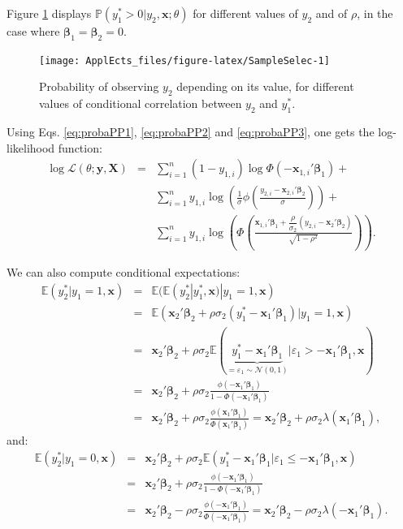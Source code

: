 \documentclass[
  12pt,
]{book}
\theoremstyle{definition}
\theoremstyle{definition}
\theoremstyle{definition}
\theoremstyle{definition}
\theoremstyle{remark}
\begin{document}
Figure \ref{fig:SampleSelec} displays \(\mathbb{P}(y_1^*>0|y_2,\mathbf{x};\theta)\) for different values of \(y_2\) and of \(\rho\), in the case where \(\boldsymbol\beta_1=\boldsymbol\beta_2=0\).

\begin{figure}
\texttt{[image: ApplEcts\_files/figure-latex/SampleSelec-1]} \caption{Probability of observing $y_2$ depending on its value, for different values of conditional correlation between $y_2$ and $y_1^*$.}\label{fig:SampleSelec}
\end{figure}

Using Eqs. \eqref{eq:probaPP1}, \eqref{eq:probaPP2} and \eqref{eq:probaPP3}, one gets the log-likelihood function:
\begin{eqnarray*}
\log \mathcal{L}(\theta;\mathbf{y},\mathbf{X}) &=& \sum_{i=1}^n  (1 - y_{1,i})\log \Phi(-\mathbf{x}_{1,i}'\boldsymbol\beta_1) + \\
&&  \sum_{i=1}^n y_{1,i} \log \left(  \frac{1}{\sigma}\phi\left(\frac{y_{2,i} - \mathbf{x}_{2,i}'\boldsymbol\beta_2}{\sigma}\right)\right) + \\
&&  \sum_{i=1}^n y_{1,i} \log \left(\Phi\left( \frac{\mathbf{x}_{1,i}'\boldsymbol\beta_1 + \dfrac{\rho}{\sigma_2}(y_{2,i}-\mathbf{x}_2'\boldsymbol\beta_2)}{\sqrt{1-\rho^2}}\right)\right).
\end{eqnarray*}

We can also compute conditional expectations:
\begin{eqnarray}
\mathbb{E}(y_2^*|y_1=1,\mathbf{x}) &=& \mathbb{E}(\mathbb{E}(y_2^*|y_1^*,\mathbf{x})|y_1=1,\mathbf{x})\nonumber\\
&=& \mathbb{E}(\mathbf{x}_2'\boldsymbol\beta_2 + \rho\sigma_2(y_1^*-\mathbf{x}_1'\boldsymbol\beta_1)|y_1=1,\mathbf{x})\nonumber\\
&=& \mathbf{x}_2'\boldsymbol\beta_2 + \rho\sigma_2\mathbb{E}( \underbrace{y_1^*-\mathbf{x}_1'\boldsymbol\beta_1}_{=\varepsilon_1 \sim\mathcal{N}(0,1)}|\varepsilon_1>-\mathbf{x}_1'\boldsymbol\beta_1,\mathbf{x})\nonumber\\
&=& \mathbf{x}_2'\boldsymbol\beta_2 + \rho\sigma_2\frac{\phi(-\mathbf{x}_1'\boldsymbol\beta_1)}{1 - \Phi(-\mathbf{x}_1'\boldsymbol\beta_1)}\nonumber\\
&=& \mathbf{x}_2'\boldsymbol\beta_2 + \rho\sigma_2\frac{\phi(\mathbf{x}_1'\boldsymbol\beta_1)}{\Phi(\mathbf{x}_1'\boldsymbol\beta_1)}=\mathbf{x}_2'\boldsymbol\beta_2 + \rho\sigma_2\lambda(\mathbf{x}_1'\boldsymbol\beta_1),\label{eq:y2y11}
\end{eqnarray}
and:
\begin{eqnarray*}
\mathbb{E}(y_2^*|y_1=0,\mathbf{x}) &=&  \mathbf{x}_2'\boldsymbol\beta_2 + \rho\sigma_2\mathbb{E}(y_1^*-\mathbf{x}_1'\boldsymbol\beta_1|\varepsilon_1\le-\mathbf{x}_1'\boldsymbol\beta_1,\mathbf{x})\\
&=& \mathbf{x}_2'\boldsymbol\beta_2 + \rho\sigma_2\frac{\phi(-\mathbf{x}_1'\boldsymbol\beta_1)}{1 - \Phi(-\mathbf{x}_1'\boldsymbol\beta_1)}\\
&=& \mathbf{x}_2'\boldsymbol\beta_2 - \rho\sigma_2\frac{\phi(-\mathbf{x}_1'\boldsymbol\beta_1)}{\Phi(-\mathbf{x}_1'\boldsymbol\beta_1)}=\mathbf{x}_2'\boldsymbol\beta_2 - \rho\sigma_2\lambda(-\mathbf{x}_1'\boldsymbol\beta_1).
\end{eqnarray*}
\end{document}
